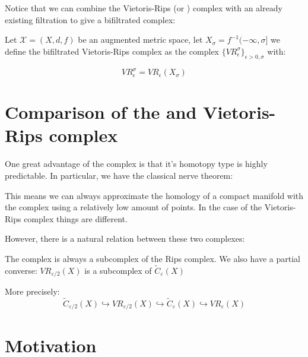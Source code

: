 Notice that we can combine the Vietoris-Rips (or {\Cech}) complex 
with an already existing filtration to give a bifiltrated complex:

\begin{definition}

Let $\mathcal{X}=(X,d,f)$ be an augmented metric space,
let $X_\sigma=f^{-1}(-\infty,\sigma]$ we define the bifiltrated
Vietoris-Rips complex as the complex
$\{{VR}_\epsilon^\sigma\}_{\epsilon>0,\sigma}$
with:

$$
{VR}_\epsilon^\sigma=
{VR}_\epsilon(X_\sigma)
$$

\end{definition}

\section{Comparison of the {\Cech} and Vietoris-Rips complex}

One great advantage of the {\Cech} complex is that it's homotopy type is highly predictable.
In particular, we have the classical {\Cech} nerve theorem:

This means we can always approximate the homology of a compact
manifold with the {\Cech} complex using a relatively low amount of points.
In the case of the Vietoris-Rips complex things are different.


However, there is a natural relation between these two complexes:

\begin{proposition}
The {\Cech} complex is always a subcomplex of the Rips complex. 
We also have a partial converse:
$VR_{\varepsilon/2}(X)$ is a subcomplex of $\tilde C_{\varepsilon}(X)$

More precisely:
$$
\tilde C_{\varepsilon/2}(X)
\hookrightarrow
VR_{\varepsilon/2}(X)
\hookrightarrow
\tilde C_{\varepsilon}(X)
\hookrightarrow
VR_{\varepsilon}(X)
$$
\end{proposition}


\section{Motivation}




